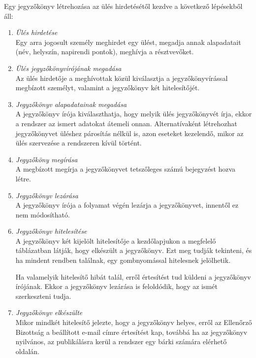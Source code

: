\documentclass[a4paper,12pt,oneside]{report}
\begin{document}
Egy jegyzőkönyv létrehozása az ülés hirdetésétől kezdve a következő lépésekből áll:

\begin{enumerate}
  \item \emph{Ülés hirdetése}\\
    Egy arra jogosult személy meghirdet egy ülést, megadja annak alapadatait (név, helyszín, napirendi pontok), meghívja a résztvevőket.
    
  \item \emph{Ülés jegyzőkönyvírójának megadása}\\
    Az ülés hirdetője a meghívottak közül kiválasztja a jegyzőkönyvírással megbízott személyt, valamint a jegyzőkönyv két hitelesítőjét.
    
  \item \emph{Jegyzőkönyv alapadatainak megadása}\\
    A jegyzőkönyv írója kiválaszthatja, hogy melyik ülés jegyzőkönyvét írja, ekkor a rendszer az ismert adatokat átemeli onnan. Alternatívaként létrehozhat jegyzőkönyvet üléshez párosítás nélkül is, azon eseteket kezelendő, mikor az ülés szervezése a rendszeren kívül történt.

  \item \emph{Jegyzőköny megírása}\\
    A megbízott megírja a jegyzőkönyvet tetszőleges számú bejegyzést hozva létre.
    
  \item \emph{Jegyzőkönyv lezárása}\\
    A jegyzőkönyv írója a folyamat végén lezárja a jegyzőkönyvet, innentől ez nem módosítható.

  \item \emph{Jegyzőkönyv hitelesítése}\\
    A jegyzőkönyv két kijelölt hitelesítője a kezdőlapjukon a megfelelő táblázatban látják, hogy elkészült a jegyzőkönyv. Ezt meg tudják tekinteni, és ha mindent rendben találnak, egy gombnyomással hitelesnek jelölhetik.

    Ha valamelyik hitelesítő hibát talál, erről értesítést tud küldeni a jegyzőkönyv írójának. Ekkor a jegyzőkönyv lezárása is feloldódik, hogy az ismét szerkeszteni tudja.

  \item \emph{Jegyzőkönyv elkészülte}\\
    Mikor mindkét hitelesítő jelezte, hogy a jegyzőkönyv helyes, erről az Ellenőrző Bizottság a beállított e-mail címre értesítést kap, továbbá ha az jegyzőkönyv nyilvános, az publikálásra kerül a rendszer egy bárki számára elérhető oldalán.

\end{enumerate}
\end{document}
